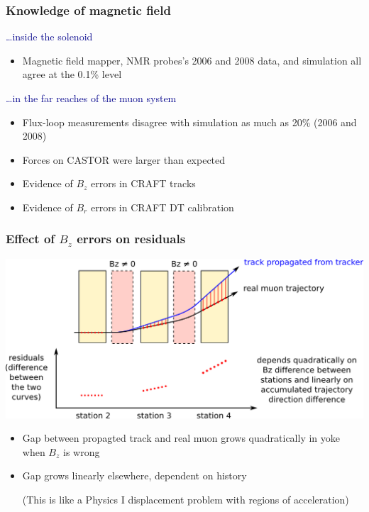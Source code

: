 \documentclass[compress]{beamer}
\begin{document}
\begin{frame}
\frametitle{Knowledge of magnetic field}

\textcolor{darkblue}{\large \ldots inside the solenoid}

\begin{center}
\begin{minipage}{0.9\linewidth}
\begin{itemize}
\item Magnetic field mapper, NMR probes's 2006 and 2008 data, and simulation all agree at the 0.1\% level
\end{itemize}
\end{minipage}
\end{center}

\vfill
\textcolor{darkblue}{\large \ldots in the far reaches of the muon system}
\begin{center}
\begin{minipage}{0.9\linewidth}
\begin{itemize}
\item Flux-loop measurements disagree with simulation as much as 20\% (2006 and 2008)
\item Forces on CASTOR were larger than expected
\item Evidence of $B_z$ errors in CRAFT tracks
\item Evidence of $B_r$ errors in CRAFT DT calibration
\end{itemize}
\end{minipage}
\end{center}
\end{frame}

\begin{frame}
\frametitle{Effect of $B_z$ errors on residuals}

\vfill
\includegraphics[width=\linewidth]{paths.png}

\vfill
\begin{itemize}
\item Gap between propagted track and real muon grows quadratically in yoke when $B_z$ is wrong
\item Gap grows linearly elsewhere, dependent on history

{\scriptsize (This is like a Physics I displacement problem with regions of acceleration)}
\end{itemize}
\end{frame}
\end{document}
